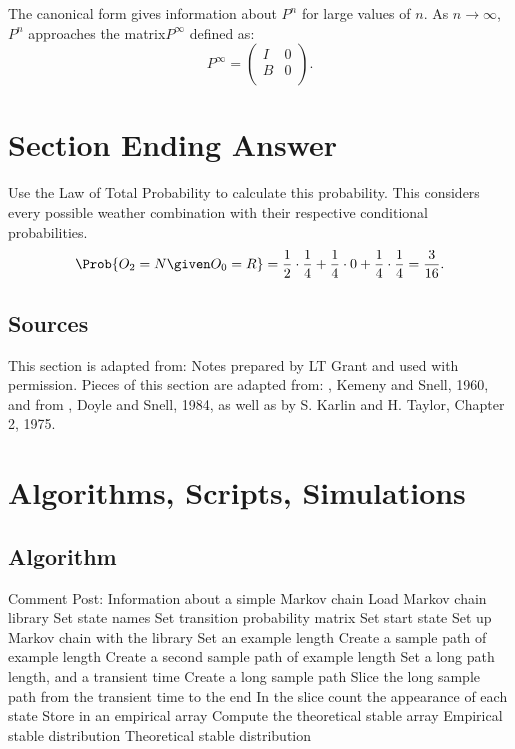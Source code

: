 \documentclass[12pt]{article}
\begin{document}
The canonical form gives information  about \( P^n \) for large values of \( n \).
As \( n\to\infty \), \( P^n \) approaches the matrix\( P^\infty \)
defined as:
\[
    P^\infty =
    \begin{pmatrix}
        I & 0 \\
        B & 0 \\
    \end{pmatrix}
    .
\]

\hr

\section*{Section Ending Answer} Use the Law of Total Probability to
calculate this probability.  This considers every possible weather
combination with their respective conditional probabilities.
\[
    \Prob{O_2 = N \given O_0 = R} = \frac{1}{2} \cdot \frac{1}{4} +
    \frac{1}{4} \cdot 0 + \frac{1}{4} \cdot \frac{1}{4} = \frac{3}{16}.
\]

\subsection*{Sources}

This section is adapted from:  Notes prepared by LT Grant and used with
permission.  Pieces of this section are adapted from:  , Kemeny and Snell, 1960, and from , Doyle and Snell, 1984, as well as  by S. Karlin and H. Taylor,
Chapter 2, 1975.

\hr

\section*{Algorithms, Scripts, Simulations}

\subsection*{Algorithm}

\begin{codebox}
     \zi Comment Post:  
    Information about a simple Markov chain \li Load Markov chain
    library \li Set state names \li Set transition probability matrix
    \li Set start state \li Set up Markov chain with the library \li Set
    an example length \li Create a sample path of example length \li
    Create a second sample path of example length \li Set a long path
    length, and a transient time \li Create a long sample path \li Slice
    the long sample path from the transient time to the end \li In the
    slice count the appearance of each state \li Store in an empirical
    array \li Compute the theoretical stable array \li \Return Empirical
    stable distribution \li \Return Theoretical stable distribution
\end{codebox}
\end{document}
